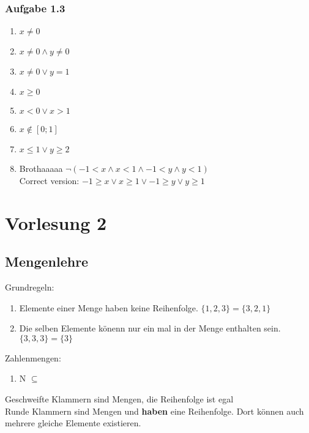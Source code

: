 \documentclass[11pt, a4paper]{article}
\begin{document}
\subsubsection{Aufgabe 1.3}
\begin{enumerate}[label=\alph*)]
\item $x \neq 0$
\item $x \neq 0 \land y \neq 0$
\item $x \neq 0 \lor y = 1$
\item $x \ge 0$
\item $x < 0 \lor x > 1$
\item $x \notin [0;1]$
\item $x \le 1 \lor y \ge 2$
\item Brothaaaaa $\lnot(-1 < x \land x < 1 \land -1 < y \land y < 1)$\\Correct version: $-1 \ge x \lor x \ge 1 \lor -1 \ge y \lor y \ge 1$
\end{enumerate}

\section{Vorlesung 2}
\subsection{Mengenlehre}
Grundregeln:\\
\begin{enumerate}
\item Elemente einer Menge haben keine Reihenfolge. $\{1,2,3\}=\{3,2,1\}$
\item Die selben Elemente könenn nur ein mal in der Menge enthalten sein. $\{3,3,3\}=\{3\}$
\end{enumerate}
Zahlenmengen:
\begin{enumerate}
\item N $\subseteq$
\end{enumerate}
Geschweifte Klammern sind Mengen, die Reihenfolge ist egal\\Runde Klammern sind Mengen und \textbf{haben} eine Reihenfolge. Dort können auch mehrere gleiche Elemente existieren.
\end{document}
